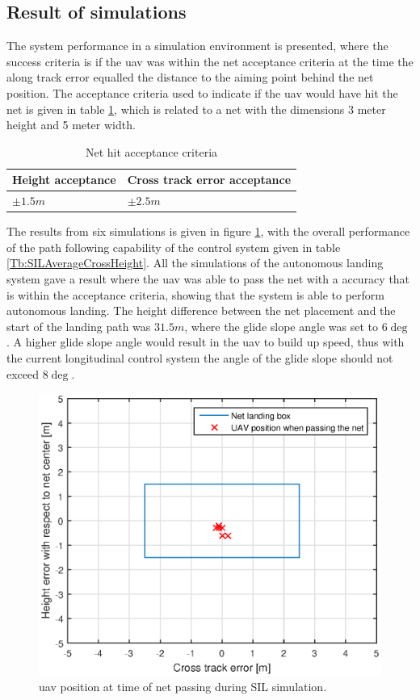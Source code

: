 \subsection{Result of simulations}\label{SIL:Results}
The system performance in a simulation environment is presented, where the success criteria is if the \gls{uav} was within the net acceptance criteria at the time the along track error equalled the distance to the aiming point behind the net position. The acceptance criteria used to indicate if the \gls{uav} would have hit the net is given in table \ref{tb:NetCriteria}, which is related to a net with the dimensions 3 meter height and 5 meter width.
\begin{table}[H]
\centering
\begin{tabular}{| l | l |}
\hline
\textbf{Height acceptance}	& \textbf{Cross track error acceptance}	\\ \hline
$\pm1.5 m$					& $\pm2.5 m$								\\ \hline
\end{tabular}
\caption{Net hit acceptance criteria}
\label{tb:NetCriteria}
\end{table}
The results from six simulations is given in figure \ref{Fig:SILNetPasing}, with the overall performance of the path following capability of the control system given in table \ref{Tb:SILAverageCrossHeight}. All the simulations of the autonomous landing system gave a result where the \gls{uav} was able to pass the net with a accuracy that is within the acceptance criteria, showing that the system is able to perform autonomous landing. The height difference between the net placement and the start of the landing path was $31.5 m$, where the glide slope angle was set to $6\deg$. A higher glide slope angle would result in the \gls{uav} to build up speed, thus with the current longitudinal control system the angle of the glide slope should not exceed $8\deg$.
\begin{figure}[H]
\centering
\includegraphics[scale=0.6]{figs/SysPlot/SILNetPasing.eps}
\caption{\gls{uav} position at time of net passing during SIL simulation.}
\label{Fig:SILNetPasing}
\end{figure}
